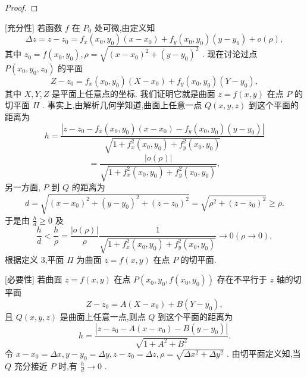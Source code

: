 \begin{proof}

\end{proof}
[充分性] 若函数 \(f\) 在 \({P}_{0}\) 处可微,由定义知
\[
{\Delta z} = z - {z}_{0} = {f}_{x}\left( {{x}_{0},{y}_{0}}\right) \left( {x - {x}_{0}}\right)  + {f}_{y}\left( {{x}_{0},{y}_{0}}\right) \left( {y - {y}_{0}}\right)  + o\left( \rho \right) ,
\]
其中 \({z}_{0} = f\left( {{x}_{0},{y}_{0}}\right) ,\rho  = \sqrt{{\left( x - {x}_{0}\right) }^{2} + {\left( y - {y}_{0}\right) }^{2}}\) . 现在讨论过点 \(P\left( {{x}_{0},{y}_{0},{z}_{0}}\right)\) 的平面
\[
Z - {z}_{0} = {f}_{x}\left( {{x}_{0},{y}_{0}}\right) \left( {X - {x}_{0}}\right)  + {f}_{y}\left( {{x}_{0},{y}_{0}}\right) \left( {Y - {y}_{0}}\right) ,
\]
其中 \(X,Y,Z\) 是平面上任意点的坐标. 我们证明它就是曲面 \(z = f\left( {x,y}\right)\) 在点 \(P\) 的切平面 \(\Pi\) . 事实上,由解析几何学知道,曲面上任意一点 \(Q\left( {x,y,z}\right)\) 到这个平面的距离为
\[
h = \frac{\left| z - {z}_{0} - {f}_{x}\left( {x}_{0},{y}_{0}\right) \left( x - {x}_{0}\right)  - {f}_{y}\left( {x}_{0},{y}_{0}\right) \left( y - {y}_{0}\right) \right| }{\sqrt{1 + {f}_{x}^{2}\left( {{x}_{0},{y}_{0}}\right)  + {f}_{y}^{2}\left( {{x}_{0},{y}_{0}}\right) }}
\]
\[
= \frac{\left| o\left( \rho \right) \right| }{\sqrt{1 + {f}_{x}^{2}\left( {{x}_{0},{y}_{0}}\right)  + {f}_{y}^{2}\left( {{x}_{0},{y}_{0}}\right) }},
\]
另一方面, \(P\) 到 \(Q\) 的距离为
\[
d = \sqrt{{\left( x - {x}_{0}\right) }^{2} + {\left( y - {y}_{0}\right) }^{2} + {\left( z - {z}_{0}\right) }^{2}} = \sqrt{{\rho }^{2} + {\left( z - {z}_{0}\right) }^{2}} \geq  \rho .
\]
于是由 \(\frac{h}{d} \geq  0\) 及
\[
\frac{h}{d} < \frac{h}{\rho } = \frac{\left| o\left( \rho \right) \right| }{\rho }\frac{1}{\sqrt{1 + {f}_{x}^{2}\left( {{x}_{0},{y}_{0}}\right)  + {f}_{y}^{2}\left( {{x}_{0},{y}_{0}}\right) }} \rightarrow  0\left( {\rho  \rightarrow  0}\right) ,
\]
根据定义 3,平面 \(\Pi\) 为曲面 \(z = f\left( {x,y}\right)\) 在点 \(P\) 的切平面.

[必要性] 若曲面 \(z = f\left( {x,y}\right)\) 在点 \(P\left( {{x}_{0},{y}_{0},f\left( {{x}_{0},{y}_{0}}\right) }\right)\) 存在不平行于 \(z\) 轴的切平面
\[
Z - {z}_{0} = A\left( {X - {x}_{0}}\right)  + B\left( {Y - {y}_{0}}\right) ,
\]
且 \(Q\left( {x,y,z}\right)\) 是曲面上任意一点,则点 \(Q\) 到这个平面的距离为
\[
h = \frac{\left| z - {z}_{0} - A\left( x - {x}_{0}\right)  - B\left( y - {y}_{0}\right) \right| }{\sqrt{1 + {A}^{2} + {B}^{2}}}.
\]
令 \(x - {x}_{0} = {\Delta x},y - {y}_{0} = {\Delta y},z - {z}_{0} = {\Delta z},\rho  = \sqrt{\Delta {x}^{2} + \Delta {y}^{2}}\) . 由切平面定义知,当 \(Q\) 充分接近 \(P\) 时,有 \(\frac{h}{d} \rightarrow  0\) .


